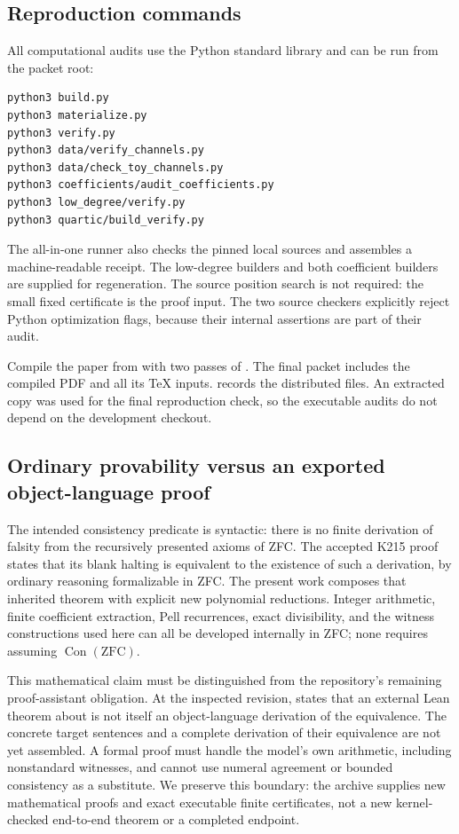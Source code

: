 \documentclass[11pt,a4paper]{article}
\newcommand{\Con}{\operatorname{Con}(\mathrm{ZFC})}
\theoremstyle{definition}
\begin{document}
\subsection{Reproduction commands}

All computational audits use the Python standard library and can be run
from the packet root:
\begin{verbatim}
python3 build.py
python3 materialize.py
python3 verify.py
python3 data/verify_channels.py
python3 data/check_toy_channels.py
python3 coefficients/audit_coefficients.py
python3 low_degree/verify.py
python3 quartic/build_verify.py
\end{verbatim}
The all-in-one runner  also checks the pinned local
sources and assembles a machine-readable receipt.  The low-degree builders
and both coefficient builders are supplied for regeneration.  The source
position search is not required: the small fixed certificate is the proof
input.  The two source checkers explicitly reject Python optimization
flags, because their internal assertions are part of their audit.

Compile the paper from  with two passes of
.  The final packet includes the
compiled PDF and all its TeX inputs.   records the
distributed files.  An extracted copy was used for the final reproduction
check, so the executable audits do not depend on the development checkout.

\subsection{Ordinary provability versus an exported object-language proof}

The intended consistency predicate is syntactic: there is no finite
derivation of falsity from the recursively presented axioms of ZFC.
The accepted K215 proof states that its blank halting is equivalent to
the existence of such a derivation, by ordinary reasoning formalizable
in ZFC.  The present work composes that inherited theorem with explicit
new polynomial reductions.  Integer arithmetic, finite coefficient
extraction, Pell recurrences, exact divisibility, and the witness
constructions used here can all be developed internally in ZFC; none
requires assuming \(\Con\).

This mathematical claim must be distinguished from the repository's
remaining proof-assistant obligation.  At the inspected revision,
 states that
an external Lean theorem about  is
not itself an object-language derivation of the equivalence.  The concrete
target sentences and a complete derivation of their equivalence are not
yet assembled.  A formal proof must handle the model's own arithmetic,
including nonstandard witnesses, and cannot use numeral agreement or
bounded consistency as a substitute.  We preserve this boundary: the
archive supplies new mathematical proofs and exact executable finite
certificates, not a new kernel-checked end-to-end theorem or a completed
 endpoint.
\end{document}
